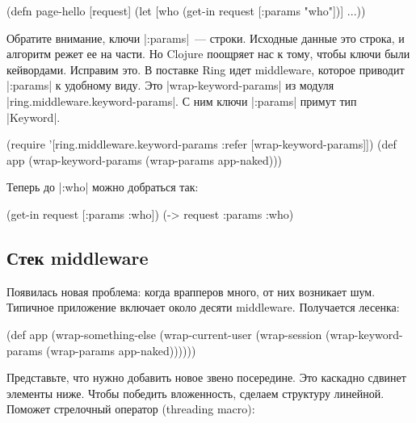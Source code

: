 \begin{english}
  \begin{clojure}
(defn page-hello [request]
  (let [who (get-in request [:params "who"])]
    ...))
  \end{clojure}
\end{english}

Обратите внимание, ключи \spverb|:params|~--- строки. Исходные данные это
строка, и алгоритм режет ее на части. Но Clojure поощряет нас к тому, чтобы
ключи были кейвордами. Исправим это. В поставке Ring идет middleware, которое
приводит \spverb|:params| к удобному виду. Это \spverb|wrap-keyword-params| из
модуля \spverb|ring.middleware.keyword-params|. С ним ключи \spverb|:params|
примут тип \spverb|Keyword|.

\begin{english}
  \begin{clojure}
(require '[ring.middleware.keyword-params
           :refer [wrap-keyword-params]])
(def app (wrap-keyword-params (wrap-params app-naked)))
  \end{clojure}
\end{english}

Теперь до \spverb|:who| можно добраться так:

\begin{english}
  \begin{clojure}
(get-in request [:params :who])
(-> request :params :who)
  \end{clojure}
\end{english}

\subsection{Стек middleware}

Появилась новая проблема: когда врапперов много, от них возникает шум. Типичное
приложение включает около десяти middleware. Получается лесенка:

\begin{english}
  \begin{clojure}
(def app
  (wrap-something-else
    (wrap-current-user
      (wrap-session
        (wrap-keyword-params
          (wrap-params app-naked))))))
  \end{clojure}
\end{english}

Представьте, что нужно добавить новое звено посередине. Это каскадно сдвинет
элементы ниже. Чтобы победить вложенность, сделаем структуру линейной. Поможет
стрелочный оператор (threading macro):

